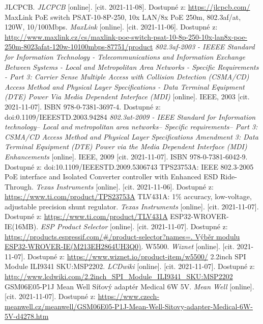 \begin{thebibliography}{3}
JLCPCB. \textit{JLCPCB} [online]. [cit. 2021-11-08]. Dostupné z: \url{https://jlcpcb.com/}
MaxLink PoE switch PSAT-10-8P-250, 10x LAN/8x PoE 250m, 802.3af/at, 120W, 10/100Mbps. \textit{MaxLink} [online]. [cit. 2021-11-06]. Dostupné z: \url{http://www.maxlink.cz/cs/maxlink-poe-switch-psat-10-8p-250-10x-lan8x-poe-250m-8023afat-120w-10100mbps-87751/product}
\textit{802.3af-2003 - IEEEE Standard for Information Technology - Telecommunications and Information Exchange Between Systems - Local and Metropolitan Area Networks - Specific Requirements - Part 3: Carrier Sense Multiple Access with Collision Detection (CSMA/CD) Access Method and Physical Layer Specifications - Data Terminal Equipment (DTE) Power Via Media Dependent Interface (MDI)} [online]. IEEE, 2003 [cit. 2021-11-07]. ISBN 978-0-7381-3697-4. Dostupné z: doi:0.1109/IEEESTD.2003.94284
\textit{802.3at-2009 - IEEE Standard for Information technology-- Local and metropolitan area networks-- Specific requirements-- Part 3: CSMA/CD Access Method and Physical Layer Specifications Amendment 3: Data Terminal Equipment (DTE) Power via the Media Dependent Interface (MDI) Enhancements} [online]. IEEE, 2009 [cit. 2021-11-07]. ISBN 978-0-7381-6042-9. Dostupné z: doi:10.1109/IEEESTD.2009.5306743
TPS23753A: IEEE 802.3-2005 PoE interface and Isolated Converter controller with Enhanced ESD Ride-Through. \textit{Texas Instruments} [online]. [cit. 2021-11-06]. Dostupné z: \url{https://www.ti.com/product/TPS23753A}
TLV431A: 1\% accuracy, low-voltage, adjustable precision shunt regulator. \textit{Texas Instruments} [online]. [cit. 2021-11-07]. Dostupné z: \url{https://www.ti.com/product/TLV431A}
ESP32-WROVER-IE(16MB). \textit{ESP Product Selector} [online]. [cit. 2021-11-07]. Dostupné z: \url{https://products.espressif.com/#/product-selector?names=. Výběr modulu ESP32-WROVER-IE(M213EH2864UH3Q0)}.
W5500. \textit{Wiznet} [online]. [cit. 2021-11-07]. Dostupné z: \url{https://www.wiznet.io/product-item/w5500/}
2.2inch SPI Module ILI9341 SKU:MSP2202. \textit{LCDwiki} [online]. [cit. 2021-11-07]. Dostupné z:  \url{http://www.lcdwiki.com/2.2inch_SPI_Module_ILI9341_SKU:MSP2202}
GSM06E05-P1J Mean Well Síťový adaptér Medical 6W 5V. \textit{Mean Well} [online]. [cit. 2021-11-07]. Dostupné z:  \url{https://www.czech-meanwell.cz/meanwell/GSM06E05-P1J-Mean-Well-Sitovy-adapter-Medical-6W-5V-d4278.htm}


\end{thebibliography}
